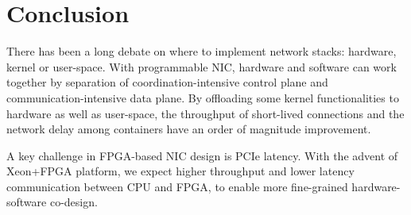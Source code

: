 \section{Conclusion}
\label{sec:conclusion}

There has been a long debate on where to implement network stacks: hardware, kernel or user-space. With programmable NIC, hardware and software can work together by separation of coordination-intensive control plane and communication-intensive data plane. By offloading some kernel functionalities to hardware as well as user-space, the throughput of short-lived connections and the network delay among containers have an order of magnitude improvement.

A key challenge in FPGA-based NIC design is PCIe latency. With the advent of Xeon+FPGA platform, we expect higher throughput and lower latency communication between CPU and FPGA, to enable more fine-grained hardware-software co-design.